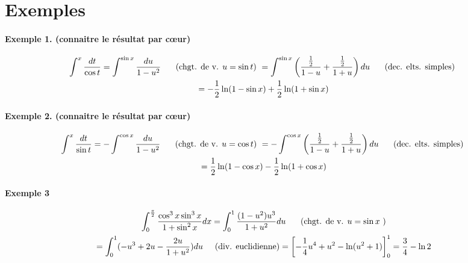 \section{Exemples}
\paragraph{Exemple 1. (connaitre le résultat par c{\oe}ur)}
\begin{multline*}
 \int^x\frac{dt}{\cos t} = \int^{\sin x}\frac{du}{1-u^2} \hspace{0.5cm}\text{ (chgt. de v. $u=\sin t$) }
= \int^{\sin x}\left( \frac{\frac{1}{2}}{1-u}+\frac{\frac{1}{2}}{1+u}\right)du  \hspace{0.5cm}\text{ (dec. elts. simples) }\\
= -\frac{1}{2}\ln(1-\sin x)+\frac{1}{2}\ln(1+\sin x)
\end{multline*}

\paragraph{Exemple 2. (connaitre le résultat par c{\oe}ur)}
\begin{multline*}
 \int^x\frac{dt}{\sin t} = -\int^{\cos x}\frac{du}{1-u^2} \hspace{0.5cm}\text{ (chgt. de v. $u=\cos t$) }
= -\int^{\cos x}\left( \frac{\frac{1}{2}}{1-u}+\frac{\frac{1}{2}}{1+u}\right)du  \hspace{0.5cm}\text{ (dec. elts. simples) }\\
= \frac{1}{2}\ln(1-\cos x)-\frac{1}{2}\ln(1+\cos x)
\end{multline*}

\paragraph{Exemple 3}
\begin{multline*}
 \int_{0}^{\frac{\pi}{2}}\frac{\cos^3x \sin^3x}{1+\sin^2x}dx = \int_{0}^{1}\frac{(1-u^2)u^3}{1+u^2}du \hspace{0.5cm}\text{ (chgt. de v. $ u=\sin x$ )} \\
= \int_{0}^{1}(-u^3+2u-\frac{2u}{1+u^2})du \hspace{0.5cm} \text{(div. euclidienne)}
=\left[ -\frac{1}{4}u^4+u^2-\ln(u^2 +1)\right]_{0}^1 = \frac{3}{4}-\ln 2 
\end{multline*}

